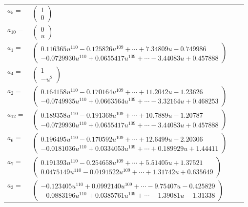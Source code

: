 \documentclass[1p]{elsarticle_modified}
\theoremstyle{definition}
\begin{document}
\begin{tabular}{m{7pt} m{180pt} m{7pt} m{180pt} }
\flushright $a_{5}=$&$\begin{pmatrix}1\\0\end{pmatrix}$ \\
\flushright $a_{10}=$&$\begin{pmatrix}0\\u\end{pmatrix}$ \\
\flushright $a_{1}=$&$\begin{pmatrix}0.116365 u^{110}-0.125826 u^{109}+\cdots+7.34809 u-0.749986\\-0.0729930 u^{110}+0.0655417 u^{109}+\cdots-3.44083 u+0.457888\end{pmatrix}$ \\
\flushright $a_{4}=$&$\begin{pmatrix}1\\- u^2\end{pmatrix}$ \\
\flushright $a_{2}=$&$\begin{pmatrix}0.164158 u^{110}-0.170164 u^{109}+\cdots+11.2042 u-1.23626\\-0.0749935 u^{110}+0.0663564 u^{109}+\cdots-3.32164 u+0.468253\end{pmatrix}$ \\
\flushright $a_{12}=$&$\begin{pmatrix}0.189358 u^{110}-0.191368 u^{109}+\cdots+10.7889 u-1.20787\\-0.0729930 u^{110}+0.0655417 u^{109}+\cdots-3.44083 u+0.457888\end{pmatrix}$ \\
\flushright $a_{6}=$&$\begin{pmatrix}0.196495 u^{110}-0.170592 u^{109}+\cdots+12.6499 u-2.20306\\-0.0181036 u^{110}+0.0334053 u^{109}+\cdots+0.189929 u+1.44411\end{pmatrix}$ \\
\flushright $a_{7}=$&$\begin{pmatrix}0.191393 u^{110}-0.254658 u^{109}+\cdots+5.51405 u+1.37521\\0.0475149 u^{110}-0.0191522 u^{109}+\cdots+1.31742 u+0.635649\end{pmatrix}$ \\
\flushright $a_{3}=$&$\begin{pmatrix}-0.123405 u^{110}+0.0992140 u^{109}+\cdots-9.75407 u-0.425829\\-0.0883196 u^{110}+0.0385761 u^{109}+\cdots-1.39081 u-1.31338\end{pmatrix}$ \\

\end{tabular}
\end{document}
